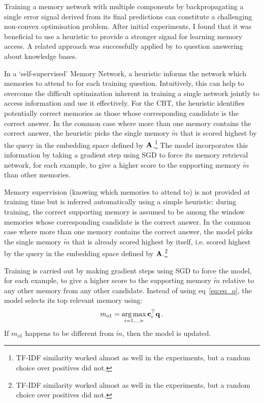 
Training a memory network with multiple components by backpropagating a single error signal derived from its final predictions can constitute a challenging non-convex optimisation problem. After initial experiments, I found that it was beneficial to use a heuristic to provide a stronger signal for learning memory access. A related approach was successfully applied by \cite{bordes2015large} to question answering about knowledge bases.

In a `self-supervised' Memory Network, a heuristic informs the network which memories to attend to for each training question. Intuitively, this can help to overcome the difficult optimization inherent in training a single network jointly to access information and use it effectively. For the CBT, the heuristic identifies potentially correct memories as those whose corresponding candidate is the correct answer. In the common case where more than one memory contains the correct answer, the heuristic picks the single memory $\tilde{m}$ that is scored highest by the query in the embedding space defined by ${\bf A}$.\footnote{TF-IDF similarity worked almost as well in the experiments, but a random choice over positives did not.} The model incorporates this information by taking a gradient step using SGD to force its memory retrieval network, for each example, to give a higher score to the supporting memory $\tilde{m}$ than other memories.
\fi

		
Memory supervision (knowing which memories to attend to) is not provided at training time but is inferred automatically using a simple heuristic: during training, the correct supporting memory is assumed to be among the window memories whose corresponding candidate is the correct answer.		
%		
In the common case where more than one memory contains the correct answer, the model picks the single memory $\tilde{m}$ that is already scored highest by itself, i.e. scored highest by the query in the embedding space defined by ${\bf A}$.\footnote{TF-IDF similarity worked almost as well in the experiments, but a random choice over positives did not.} 

Training is carried out by making gradient steps using SGD to force the model, for each example, to give a higher score to the supporting memory $\tilde{m}$ relative to any other memory from any other candidate.
%
Instead of using  eq~\eqref{eq:eq_o}, the model selects its top relevant memory using:
\begin{equation} \label{eq:salient}
  m_{o1} = \argmax_{i=1,\dots n} \bc_i^\top\bq \, .%
\end{equation}
%
If $m_{o1}$ happens to be different from $\tilde{m}$, then the model is updated.


